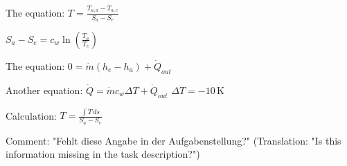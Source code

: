 The equation:  
\( T = \frac{T_{a,a} - T_{a,e}}{S_a - S_e} \)  

\( S_a - S_e = c_{w} \ln \left( \frac{T_a}{T_c} \right) \)  

The equation:  
\( 0 = \dot{m} (h_e - h_a) + \dot{Q}_{out} \)  

Another equation:  
\( \dot{Q} = \dot{m} c_{w} \Delta T + \dot{Q}_{out} \)  
\( \Delta T = -10 \, \text{K} \)  

Calculation:  
\( T = \frac{\int \dot{T} \, ds}{S_a - S_e} \)  

Comment:  
"Fehlt diese Angabe in der Aufgabenstellung?" (Translation: "Is this information missing in the task description?")